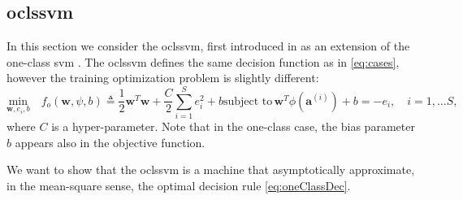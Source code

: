 \documentclass[draftcls,onecolumn,12pt]{IEEEtran}
\begin{document}
\subsection{\Acl{oclssvm}}
In this section we consider the \ac{oclssvm}, first introduced in \cite{choi2009least} as an extension of the one-class \ac{svm} \cite{Scholkopf2001estimating}. The \ac{oclssvm} defines the same decision function as in \eqref{eq:cases}, however the training optimization problem is slightly different:
\begin{subequations}
	\label{eq:oneClassSvm}
	\begin{equation}
	\label{eq:oneClass1}
	\underset{\mathbf{w},e_i, b}{\text{min}} \quad f_o(\mathbf{w},\psi, b) \triangleq
	 \frac{1}{2} \mathbf{w}^T \mathbf{w} +  \frac{C}{2} \sum_{i=1}^S e_i^2 + b 
	\end{equation}
	\begin{equation}
	\label{eq:oneClassConstr}
	\text{subject to}\, \mathbf{w}^T \phi (\mathbf{a}^{(i)}) + b = - e_i,  \quad i = 1,\dots S, 
	\end{equation}
\end{subequations}
where $C$ is a hyper-parameter.
Note that in the one-class case, the bias parameter $b$ appears also in the objective function.

We want to show that the \ac{oclssvm} is a machine that asymptotically approximate, in the mean-square sense, the optimal decision rule \eqref{eq:oneClassDec}.
\end{document}
